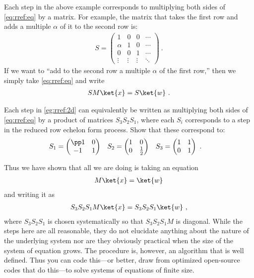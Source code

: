 Each step in the above example corresponds to multiplying both sides of \eqref{eq:rref:eq} by a matrix. For example, the matrix that takes the first row and adds a multiple $\alpha$ of it to the second row is:
\begin{align}
    S = 
    \begin{pmatrix}
        1 & 
        0 & 
        0 & 
        \cdots 
        \\
        \alpha & 
        1 & 
        0  & 
        \cdots 
        \\
        0 & 
        0 & 
        1  & 
        \cdots 
        \\
        \vdots &
        \vdots &
        \vdots &
        \ddots 
    \end{pmatrix} \ .
\end{align}
If we want to ``add to the second row a multiple $\alpha$ of the first row,'' then we simply take \eqref{eq:rref:eq} and write
\begin{align}
    SM\ket{x} = S\ket{w} \ .
\end{align}
\begin{exercise}
Each step in \eqref{eg:rref:2d} can equivalently be written as multiplying both sides of \eqref{eq:rref:eq} by a product of matrices $S_3 S_2 S_1$, where each $S_i$ corresponds to a step in the reduced row echelon form process. Show that these correspond to:
\begin{align}
    S_1
    &=
    \begin{pmatrix}
        \pp 1 & 0 \\
        -1 & 1
    \end{pmatrix}
    &
    S_2
    &=
    \begin{pmatrix}
        1 & 0 \\
        0 & \frac{1}{2}
    \end{pmatrix}
    &
    S_3
    &=
    \begin{pmatrix}
        1 & 1 \\
        0 & 1
    \end{pmatrix} \ .
\end{align}
\end{exercise}

Thus we have shown that all we are doing is taking an equation 
\begin{align}
    M\ket{x} = \ket{w}
\end{align}
and writing it as
\begin{align}
    S_3 S_2 S_1 M \ket{x} = S_3 S_2 S_1 \ket{w} \ ,
\end{align}
where $S_3 S_2 S_1$ is chosen systematically so that $S_3 S_2 S_1 M$ is diagonal. While the steps here are all reasonable, they do not elucidate anything about the nature of the underlying system nor are they obviously practical when the size of the system of equation grows. The procedure is, however, an algorithm that is well defined. Thus you can code this---or better, draw from optimized open-source codes that do this---to solve systems of equations of finite size. 



